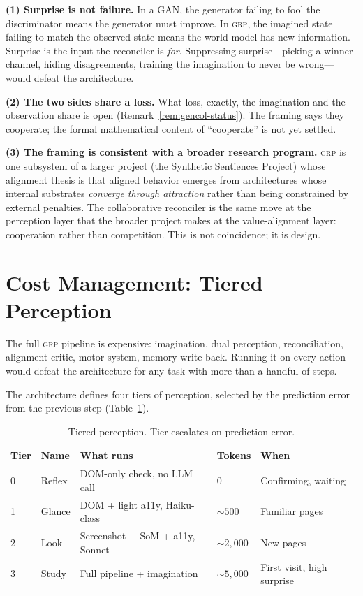 \documentclass[12pt]{article}
\theoremstyle{definition}
\theoremstyle{remark}
\newcommand{\grp}{\textsc{grp}}
\begin{document}
\textbf{(1) Surprise is not failure.} In a GAN, the generator failing
to fool the discriminator means the generator must improve. In \grp{},
the imagined state failing to match the observed state means the world
model has new information. Surprise is the input the reconciler is
\emph{for}. Suppressing surprise---picking a winner channel, hiding
disagreements, training the imagination to never be wrong---would
defeat the architecture.

\textbf{(2) The two sides share a loss.} What loss, exactly, the
imagination and the observation share is open
(Remark~\ref{rem:gencol-status}). The framing says they cooperate; the
formal mathematical content of ``cooperate'' is not yet settled.

\textbf{(3) The framing is consistent with a broader research
program.} \grp{} is one subsystem of a larger project (the Synthetic
Sentiences Project) whose alignment thesis is that aligned behavior
emerges from architectures whose internal substrates \emph{converge
through attraction} rather than being constrained by external
penalties. The collaborative reconciler is the same move at the
perception layer that the broader project makes at the
value-alignment layer: cooperation rather than competition. This is
not coincidence; it is design.

\section{Cost Management: Tiered Perception}
\label{sec:cost}

The full \grp{} pipeline is expensive: imagination, dual perception,
reconciliation, alignment critic, motor system, memory write-back.
Running it on every action would defeat the architecture for any task
with more than a handful of steps.

The architecture defines four tiers of perception, selected by the
prediction error from the previous step (Table~\ref{tab:tiers}).

\begin{table}[h]
\centering
\begin{tabular}{lllll}
\toprule
\textbf{Tier} & \textbf{Name} & \textbf{What runs} & \textbf{Tokens} & \textbf{When} \\
\midrule
0 & Reflex & DOM-only check, no LLM call & 0 & Confirming, waiting \\
1 & Glance & DOM + light a11y, Haiku-class & $\sim 500$ & Familiar pages \\
2 & Look & Screenshot + SoM + a11y, Sonnet & $\sim 2{,}000$ & New pages \\
3 & Study & Full pipeline + imagination & $\sim 5{,}000$ & First visit, high surprise \\
\bottomrule
\end{tabular}
\caption{Tiered perception. Tier escalates on prediction error.}
\label{tab:tiers}
\end{table}
\end{document}
